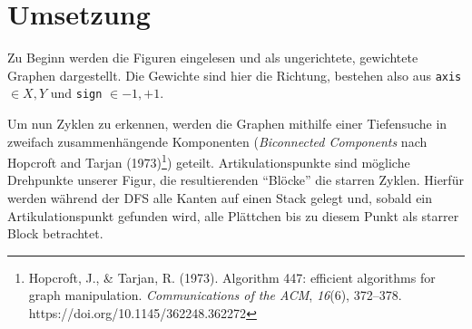 \documentclass[a4paper,10pt,ngerman]{scrartcl}
\begin{document}
    \section{Umsetzung}
    Zu Beginn werden die Figuren eingelesen und als ungerichtete, gewichtete Graphen dargestellt. Die Gewichte sind hier
    die Richtung, bestehen also aus \texttt{axis} $\in {X, Y}$ und \texttt{sign} $\in {-1, +1}$.

    Um nun Zyklen zu erkennen, werden die Graphen mithilfe einer Tiefensuche in zweifach zusammenhängende Komponenten
    (\textit{Biconnected Components} nach Hopcroft and Tarjan (1973)\footnote{
        Hopcroft, J., \& Tarjan, R. (1973). Algorithm 447: efficient algorithms for graph manipulation.
        \textit{Communications of the ACM}, \textit{16}(6), 372–378. https://doi.org/10.1145/362248.362272
    }) geteilt. Artikulationspunkte sind mögliche Drehpunkte unserer Figur, die resultierenden ``Blöcke'' die starren
    Zyklen. Hierfür werden während der DFS alle Kanten auf einen Stack gelegt und, sobald ein Artikulationspunkt
    gefunden wird, alle Plättchen bis zu diesem Punkt als starrer Block betrachtet.
\end{document}
